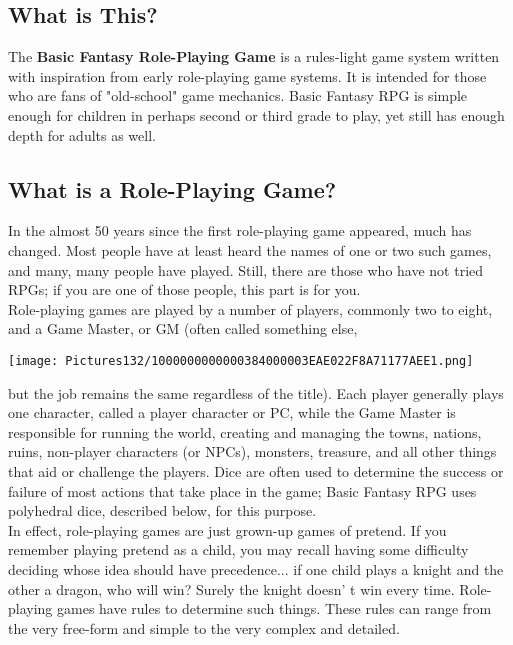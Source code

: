 \documentclass[a4paper,twoside,openany,10pt]{book}
\begin{document}
\begin{multicols}{2}

\subsection{What is This?}\label{what-is-this}

The \textbf{Basic Fantasy Role-Playing Game} is a rules-light game system written with inspiration from early role-playing game systems. It is intended for those who are fans of "old-school" game mechanics. Basic Fantasy RPG is simple enough for children in perhaps second or third
grade to play, yet still has enough depth for adults as well. 

\subsection{What is a Role-Playing Game?}\label{what-is-a-role-playing-game}

In the almost 50 years since the first role-playing game appeared, much has changed. Most people have at least heard the names of one or two such games, and many, many people have played. Still, there are those who have not tried RPGs; if you are one of those people, this part is for you.\\

Role-playing games are played by a number of players, commonly two to eight, and a Game Master, or GM (often called something else,

\texttt{[image: Pictures132/1000000000000384000003EAE022F8A71177AEE1.png]}

but the job remains the same regardless of the title). Each player generally plays one character, called a player character or PC, while the Game Master is responsible for running the world, creating and managing the towns, nations, ruins, non-player characters (or NPCs), monsters, treasure, and all other things that aid or challenge the players. Dice are often used to determine the success or failure of most actions that take place in the game; Basic Fantasy RPG uses polyhedral dice, described below, for this purpose.\\

In effect, role-playing games are just grown-up games of pretend. If you remember playing pretend as a child, you may recall having some difficulty deciding whose idea should have precedence... if one child plays a knight and the other a dragon, who will win? Surely the knight doesn' t win every time. Role-playing games have rules to determine such things. These rules can range from the very free-form and simple to the very complex and detailed.


\end{multicols}
\end{document}
